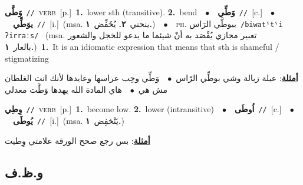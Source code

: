\documentclass[10pt,a4paper,twoside]{article} %
\begin{document}
\begin{multicols}{2}
{\setlength\topsep{0pt}\textbf{\foreignlanguage{arabic}{وَطَّى}}\ {\color{gray}\texttt{//}\color{black}}\ \textsc{verb}\ [p.]\ \textbf{1.}~lower sth (transitive).  \textbf{2.}~bend\ \ $\bullet$\ \ \setlength\topsep{0pt}\textbf{\foreignlanguage{arabic}{وَطِّي}}\ {\color{gray}\texttt{//}\color{black}}\ [c.]\ \ $\bullet$\ \ \setlength\topsep{0pt}\textbf{\foreignlanguage{arabic}{يوَطِّي}}\ {\color{gray}\texttt{//}\color{black}}\ [i.]\ \color{gray}(msa. \foreignlanguage{arabic}{ينحني}~\foreignlanguage{arabic}{\textbf{٢.}}  \foreignlanguage{arabic}{يُخَفِّض}~\foreignlanguage{arabic}{\textbf{١.}})\color{black}\ \ $\bullet$\ \ \textsc{ph.} \color{gray} \foreignlanguage{arabic}{بيوطَّي الرَاس}\color{black}\ {\color{gray}\texttt{/{\sffamily biwatˤtˤi ʔirraːs}/}\color{black}}\ \color{gray} (msa. \foreignlanguage{arabic}{تعبير مجازي يُقْصَد به أنّ شيئما ما يدعو للخجل والشعور بالعار}~\foreignlanguage{arabic}{\textbf{١.}})\color{black}\ \textbf{1.}~It is an idiomatic expression that means that sth is shameful / stigmatizing\  \begin{flushright}\color{gray}\foreignlanguage{arabic}{\textbf{\underline{\foreignlanguage{arabic}{أمثلة}}}: عيلة زبالة وشي بوطِّي الرّاس\ $\bullet$\ \  وَطِّي وحِب عراسها وعايدها لأنك انت الغلطان مش هي\ $\bullet$\ \  هاي المادة الله يهدها وَطَّت معدلي}\end{flushright}\color{black}} \vspace{2mm}

{\setlength\topsep{0pt}\textbf{\foreignlanguage{arabic}{وِطِي}}\ {\color{gray}\texttt{//}\color{black}}\ \textsc{verb}\ [p.]\ \textbf{1.}~become low.  \textbf{2.}~lower (intransitive)\ \ $\bullet$\ \ \setlength\topsep{0pt}\textbf{\foreignlanguage{arabic}{اُوطَى}}\ {\color{gray}\texttt{//}\color{black}}\ [c.]\ \ $\bullet$\ \ \setlength\topsep{0pt}\textbf{\foreignlanguage{arabic}{يُوطَى}}\ {\color{gray}\texttt{//}\color{black}}\ [i.]\ \color{gray}(msa. \foreignlanguage{arabic}{يَنْخفِض}~\foreignlanguage{arabic}{\textbf{١.}})\color{black}\  \begin{flushright}\color{gray}\foreignlanguage{arabic}{\textbf{\underline{\foreignlanguage{arabic}{أمثلة}}}: بس رجع صحح الورقة علامتي وِطيت}\end{flushright}\color{black}} \vspace{2mm}

\vspace{-3mm}
\subsection*{\color{blue}\foreignlanguage{arabic}{و.ظ.ف}\color{blue}{}} 


\end{multicols}
\end{document}
